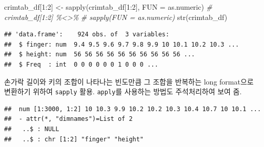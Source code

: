 \documentclass[
]{article}
\newenvironment{Shaded}{\begin{snugshade}}{\end{snugshade}}
\newcommand{\AttributeTok}[1]{\textcolor[rgb]{0.77,0.63,0.00}{#1}}
\newcommand{\CommentTok}[1]{\textcolor[rgb]{0.56,0.35,0.01}{\textit{#1}}}
\newcommand{\ControlFlowTok}[1]{\textcolor[rgb]{0.13,0.29,0.53}{\textbf{#1}}}
\newcommand{\DecValTok}[1]{\textcolor[rgb]{0.00,0.00,0.81}{#1}}
\newcommand{\FunctionTok}[1]{\textcolor[rgb]{0.00,0.00,0.00}{#1}}
\newcommand{\NormalTok}[1]{#1}
\newcommand{\OtherTok}[1]{\textcolor[rgb]{0.56,0.35,0.01}{#1}}
\newcommand{\SpecialCharTok}[1]{\textcolor[rgb]{0.00,0.00,0.00}{#1}}
\newcommand{\StringTok}[1]{\textcolor[rgb]{0.31,0.60,0.02}{#1}}
\begin{document}
\begin{Shaded}
\begin{Highlighting}[]
\NormalTok{crimtab\_df[}\DecValTok{1}\SpecialCharTok{:}\DecValTok{2}\NormalTok{] }\OtherTok{\textless{}{-}} \FunctionTok{sapply}\NormalTok{(crimtab\_df[}\DecValTok{1}\SpecialCharTok{:}\DecValTok{2}\NormalTok{], }
                          \AttributeTok{FUN =}\NormalTok{ as.numeric)}
\CommentTok{\# crimtab\_df[1:2] \%\textless{}\textgreater{}\%}
\CommentTok{\#   sapply(FUN = as.numeric)}
\FunctionTok{str}\NormalTok{(crimtab\_df)}
\end{Highlighting}
\end{Shaded}

\begin{verbatim}
## 'data.frame':    924 obs. of  3 variables:
##  $ finger: num  9.4 9.5 9.6 9.7 9.8 9.9 10 10.1 10.2 10.3 ...
##  $ height: num  56 56 56 56 56 56 56 56 56 56 ...
##  $ Freq  : int  0 0 0 0 0 0 1 0 0 0 ...
\end{verbatim}

손가락 길이와 키의 조합이 나타나는 빈도만큼 그 조합을 반복하는 long
format으로 변환하기 위하여 \texttt{sapply} 활용. \texttt{apply}를
사용하는 방법도 주석처리하여 보여 줌.

\begin{Shaded}
\end{Shaded}

\begin{verbatim}
##  num [1:3000, 1:2] 10 10.3 9.9 10.2 10.2 10.3 10.4 10.7 10 10.1 ...
##  - attr(*, "dimnames")=List of 2
##   ..$ : NULL
##   ..$ : chr [1:2] "finger" "height"
\end{verbatim}
\end{document}
